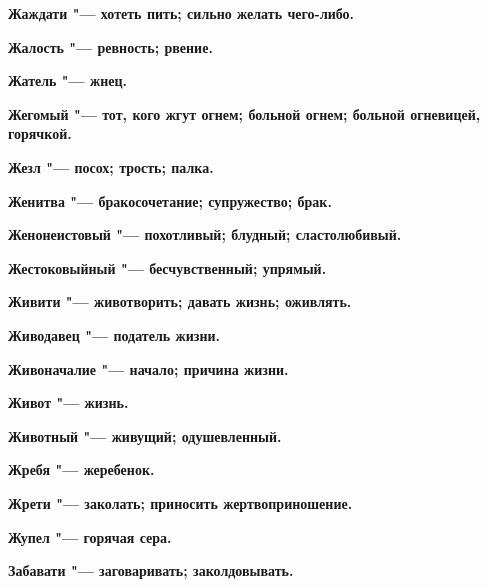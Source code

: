  





\bfseries Жаждати \normalfont{} "--- хотеть пить; сильно желать чего-либо. 




\bfseries Жалость \normalfont{} "--- ревность; рвение. 




\bfseries Жатель \normalfont{} "--- жнец. 




\bfseries Жегомый \normalfont{} "--- тот, кого жгут огнем; больной огнем; больной огневицей, горячкой. 




\bfseries Жезл \normalfont{} "--- посох; трость; палка. 




\bfseries Женитва \normalfont{} "--- бракосочетание; супружество; брак. 




\bfseries Женонеистовый \normalfont{} "--- похотливый; блудный; сластолюбивый. 




\bfseries Жестоковыйный \normalfont{} "--- бесчувственный; упрямый. 




\bfseries Живити \normalfont{} "--- животворить; давать жизнь; оживлять. 




\bfseries Живодавец \normalfont{} "--- податель жизни. 




\bfseries Живоначалие \normalfont{} "--- начало; причина жизни. 




\bfseries Живот \normalfont{} "--- жизнь. 




\bfseries Животный \normalfont{} "--- живущий; одушевленный. 




\bfseries Жребя \normalfont{} "--- жеребенок. 




\bfseries Жрети \normalfont{} "--- заколать; приносить жертвоприношение. 




\bfseries Жупел \normalfont{} "--- горячая сера. 




 





\bfseries Забавати \normalfont{} "--- заговаривать; заколдовывать. 




